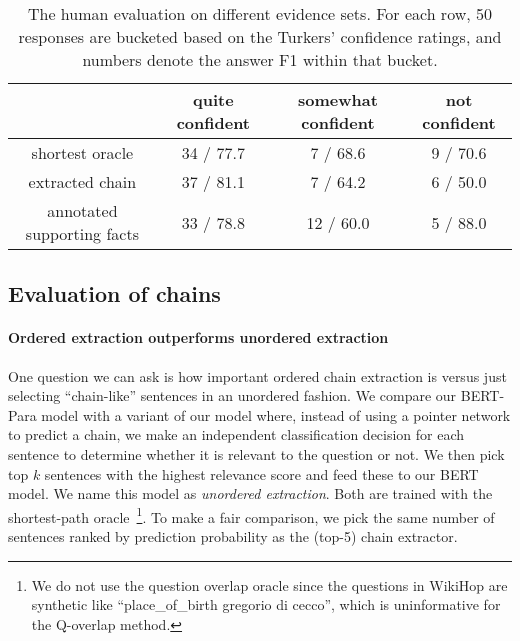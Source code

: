 \documentclass[11pt,a4paper]{article}
\begin{document}
\begin{table*}[t]
\small
\centering
\renewcommand{\tabcolsep}{1.3mm}
\begin{tabular}{ c  c   c   c   }
\toprule
            & quite confident  & somewhat confident & not confident    \\
\midrule
shortest oracle  &  34 / 77.7 & 7 / 68.6  & 9 / 70.6  \\
extracted chain  & 37 / 81.1 & 7 / 64.2 & 6 / 50.0 \\
annotated supporting facts  & 33 / 78.8 & 12 / 60.0  & 5 / 88.0 \\
\bottomrule
\end{tabular}
\caption{The human evaluation on different evidence sets. For each row, 50 responses are bucketed based on the Turkers' confidence ratings, and numbers denote the answer F1 within that bucket.}
\vspace{-0.5cm}
\label{tab:human_eval}
\end{table*}








\subsection{Evaluation of chains}

\paragraph{Ordered extraction outperforms unordered extraction} One question we can ask is how important ordered chain extraction is versus just selecting ``chain-like'' sentences in an unordered fashion. We compare our BERT-Para model with a variant of our model where, instead of using a pointer network to predict a chain, we make an independent classification decision for each sentence to determine whether it is relevant to the question or not. We then pick top $k$ sentences with the highest relevance score and feed these to our BERT model. We name this model as \emph{unordered extraction}. Both are trained with the shortest-path oracle~\footnote{We do not use the question overlap oracle since the questions in WikiHop are synthetic like ``place\_of\_birth gregorio di cecco'', which is uninformative for the Q-overlap method.}. To make a fair comparison, we pick the same number of sentences ranked by prediction probability as the (top-5) chain extractor. 
\end{document}
